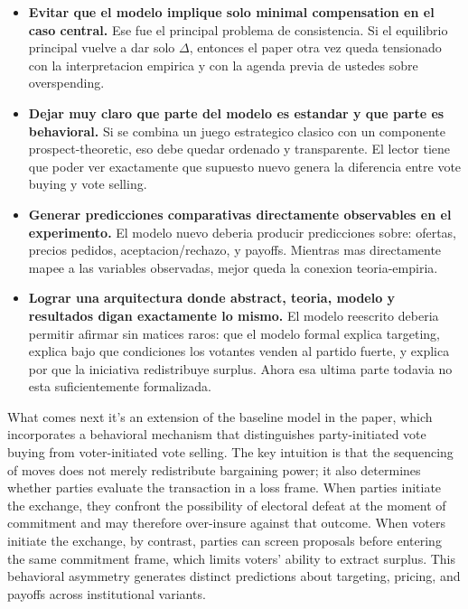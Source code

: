 \documentclass[11pt]{article}
\begin{document}
\begin{itemize}
\item \textbf{Evitar que el modelo implique solo minimal compensation en el caso central.}  
Ese fue el principal problema de consistencia. Si el equilibrio principal vuelve a dar solo $\Delta$, entonces el paper otra vez queda tensionado con la interpretacion empirica y con la agenda previa de ustedes sobre overspending.

\item \textbf{Dejar muy claro que parte del modelo es estandar y que parte es behavioral.}  
Si se combina un juego estrategico clasico con un componente prospect-theoretic, eso debe quedar ordenado y transparente. El lector tiene que poder ver exactamente que supuesto nuevo genera la diferencia entre vote buying y vote selling.

\item \textbf{Generar predicciones comparativas directamente observables en el experimento.}  
El modelo nuevo deberia producir predicciones sobre: ofertas, precios pedidos, aceptacion/rechazo, y payoffs. Mientras mas directamente mapee a las variables observadas, mejor queda la conexion teoria-empiria.

\item \textbf{Lograr una arquitectura donde abstract, teoria, modelo y resultados digan exactamente lo mismo.}  
El modelo reescrito deberia permitir afirmar sin matices raros: que el modelo formal explica targeting, explica bajo que condiciones los votantes venden al partido fuerte, y explica por que la iniciativa redistribuye surplus. Ahora esa ultima parte todavia no esta suficientemente formalizada.

\end{itemize}

What comes next it's an extension of the baseline model in the paper, which incorporates a behavioral mechanism that distinguishes party-initiated vote buying from voter-initiated vote selling. The key intuition is that the sequencing of moves does not merely redistribute bargaining power; it also determines whether parties evaluate the transaction in a loss frame. When parties initiate the exchange, they confront the possibility of electoral defeat at the moment of commitment and may therefore over-insure against that outcome. When voters initiate the exchange, by contrast, parties can screen proposals before entering the same commitment frame, which limits voters' ability to extract surplus. This behavioral asymmetry generates distinct predictions about targeting, pricing, and payoffs across institutional variants.
\end{document}
